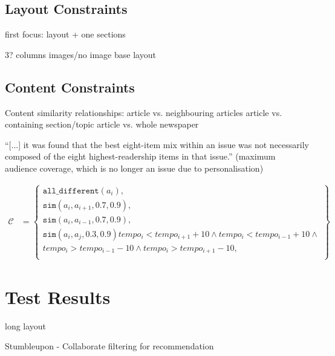 \subsection{Layout Constraints}
first focus: layout + one sections

3? columns
images/no image
base layout



\subsection{Content Constraints}
Content similarity relationships:
article vs. neighbouring articles
article vs. containing section/topic
article vs. whole newspaper

``[...] it was found that the best eight-item  mix within an issue was not necessarily composed of the eight highest-readership items in that issue.'' \cite{EditorsDilemma} (maximum audience coverage, which is no longer an issue due to personalisation)

\begin{align*}
\mathcal{C} &=	\begin{Bmatrix}
					\texttt{all\_different}(a_i),\\
					\texttt{sim}(a_i, a_{i+1}, 0.7, 0.9), \\
					\texttt{sim}(a_i, a_{i-1}, 0.7, 0.9), \\
					\texttt{sim}(a_i, a_j, 0.3, 0.9)
					tempo_i < tempo_{i+1} + 10 \wedge tempo_i < tempo_{i-1} + 10 \wedge\\
					tempo_i > tempo_{i-1} - 10 \wedge tempo_i > tempo_{i+1} - 10,\\
				\end{Bmatrix}
\end{align*}



\section{Test Results}
long layout

Stumbleupon - Collaborate filtering for recommendation

